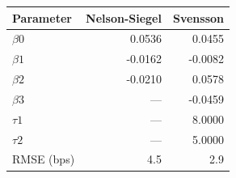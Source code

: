 \begin{tabular}{lrr}
\toprule
Parameter & Nelson-Siegel & Svensson \\
\midrule
$\beta0$ & 0.0536 & 0.0455 \\
$\beta1$ & -0.0162 & -0.0082 \\
$\beta2$ & -0.0210 & 0.0578 \\
$\beta3$ & --- & -0.0459 \\
$\tau1$ & --- & 8.0000 \\
$\tau2$ & --- & 5.0000 \\
\midrule
RMSE (bps) & 4.5 & 2.9 \\
\bottomrule
\end{tabular}

